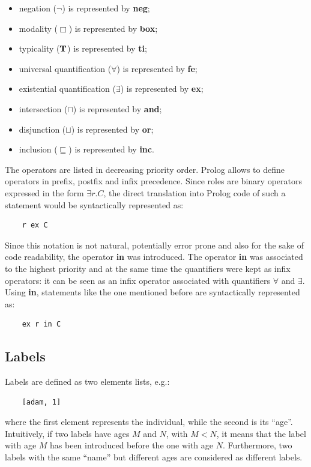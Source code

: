 \documentclass[a4paper, 11pt, oneside]{duthesis}
\newcommand{\tip}{{\bf T}}
\newcommand{\perogni} {\forall}
\newcommand{\esiste} {\exists}
\begin{document}
\begin{itemize}
\item negation ($\neg$) is represented by \textbf{neg};
\item modality ($\Box$) is represented by \textbf{box};
\item typicality ($\tip$) is represented by \textbf{ti};
\item universal quantification ($\perogni$) is represented by \textbf{fe};
\item existential quantification ($\esiste$) is represented by \textbf{ex};
\item intersection ($\sqcap$) is represented by \textbf{and};
\item disjunction ($\sqcup$) is represented by \textbf{or};
\item inclusion ($\sqsubseteq$) is represented by \textbf{inc}.
\end{itemize}

The operators are listed in decreasing priority order.
Prolog allows to define operators in prefix, postfix and infix precedence.
Since roles are binary operators expressed in the form $\esiste r.C$, the direct translation into Prolog code of such a statement would be syntactically represented as:
\begin{verbatim}
    r ex C
\end{verbatim}
Since this notation is not natural, potentially error prone and also for the sake of code readability, the operator \textbf{in} was introduced.
The operator \textbf{in} was associated to the highest priority and at the same time the quantifiers were kept as infix operators: it can be seen as an infix operator associated with quantifiers $\perogni$ and $\esiste$.
Using \textbf{in}, statements like the one mentioned before are syntactically represented as:
\begin{verbatim}
    ex r in C
\end{verbatim}

\subsection{Labels}
Labels are defined as two elements lists, e.g.:
\begin{verbatim}
    [adam, 1]
\end{verbatim}
where the first element represents the individual, while the second is its ``age''.
Intuitively, if two labels have ages $M$ and $N$, with $M < N$, it means that the label with age $M$ has been introduced before the one with age $N$.
Furthermore, two labels with the same ``name'' but different ages are considered as different labels.\\
\end{document}
